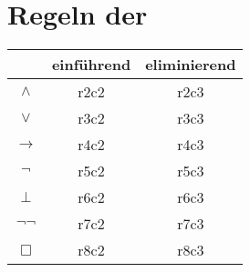 \appendix



\chapter{Regeln der \ND} %
\label{cha:regeln_der_nd}


\newcommand{\wedgeI}{
	
}

\begin{center}
	\begin{tabular}{c|cc}
	  & einführend & eliminierend\\
	\hline
	\hline
	$\wedge$ 			& r2c2 & r2c3\\
	$\vee$ 				& r3c2 & r3c3\\
	$\rightarrow$ & r4c2 & r4c3\\
	$\neg$ 				& r5c2 & r5c3\\
	$\bot$ 				& r6c2 & r6c3\\
	$\neg \neg$ 	& r7c2 & r7c3\\
	$\Box$ 				& r8c2 & r8c3\\
	\end{tabular}
\end{center}

